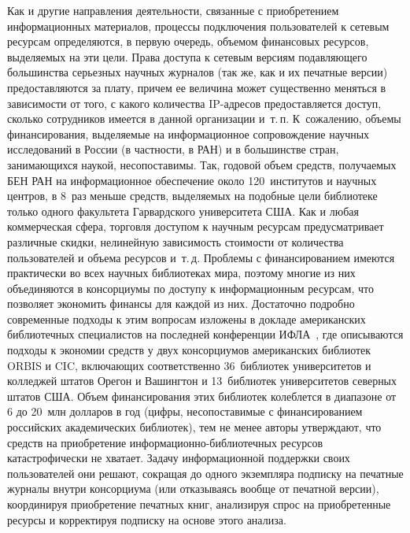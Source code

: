 \begin{multicols}{2}
   Как и другие направления деятельности, связанные с приобретением информационных 
материалов, процессы подключения пользователей к сетевым ресурсам определяются, в 
первую очередь, объемом финансовых ресурсов, выделяемых на эти цели. Права доступа 
к сетевым версиям по\-дав\-ля\-юще\-го большинства серьезных научных журналов (так же, как 
и их печатные версии) предоставляются за плату, причем ее величина может существенно 
меняться в зависимости от того, с какого количества IP-ад\-ре\-сов предоставляется 
доступ, сколько сотрудников имеется в данной организации и~т.\,п. К~сожалению, 
объемы финансирования, вы\-де\-ля\-емые на информационное сопровождение научных 
исследований в России (в част\-ности, в РАН) и в большинстве стран, занимающихся 
наукой, несопоставимы. Так, годовой объем средств, получаемых БЕН РАН на 
информационное обеспечение около 120~институтов и научных центров, в 8~раз меньше 
средств, выделяемых на подобные цели библиотеке только одного факультета 
Гарвардского университета США. Как и любая коммерческая сфера, торговля доступом к 
научным ресурсам пред\-усмат\-ри\-ва\-ет различные скидки, нелинейную зависимость 
стоимости от количества пользователей и объема ресурсов и~т.\,д. Проблемы с 
финансированием имеются практически во всех научных библиотеках мира, поэтому 
многие из них объединяются в консорциумы по доступу к информационным ресурсам, 
что позволяет экономить финансы для каждой из них. Достаточно подробно современные 
подходы к этим вопросам изложены в докладе американских библиотечных специалистов 
на последней конференции ИФЛА~\cite{14kale}, где описываются подходы к экономии 
средств у двух консорциумов американских библиотек \mbox{ORBIS} и \mbox{CIC}, 
вклю\-ча\-ющих соответственно 36~биб\-лио\-тек университетов и колледжей штатов Орегон 
и Вашингтон и 13~биб\-лио\-тек университетов северных штатов США. Объем 
финансирования этих библиотек колеблется в диапазоне от 6 до 20~млн долларов в 
год (цифры, несопоставимые с финансированием российских академических библиотек), 
тем не менее авторы утверждают, что средств на приобретение 
ин\-фор\-ма\-ци\-он\-но-биб\-лио\-теч\-ных ресурсов катастрофически не хватает. 
Задачу информационной поддержки 
своих пользователей они решают, сокращая до одного экземпляра подписку на печатные 
журналы внутри консорциума (или отказываясь вообще от печатной версии), координируя 
приобретение печатных книг, анализируя спрос на приобретенные ресурсы и корректируя 
подписку на основе этого анализа. 
   

\end{multicols}
